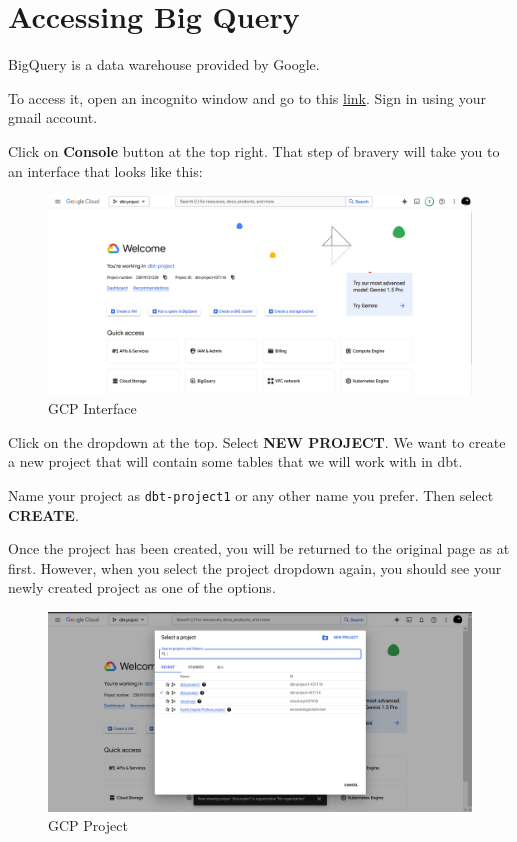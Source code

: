 \documentclass[
]{book}
\begin{document}
\hypertarget{accessing-big-query}{%
\section{Accessing Big Query}\label{accessing-big-query}}

BigQuery is a data warehouse provided by Google.

To access it, open an incognito window and go to this \href{https://cloud.google.com/}{link}. Sign in using your gmail account.

Click on \textbf{Console} button at the top right. That step of bravery will take you to an interface that looks like this:

\begin{figure}
\centering
\includegraphics{./images/gcp_interface.png}
\caption{GCP Interface}
\end{figure}

Click on the dropdown at the top. Select \textbf{NEW PROJECT}. We want to create a new project that will contain some tables that we will work with in dbt.

Name your project as \texttt{dbt-project1} or any other name you prefer. Then select \textbf{CREATE}.

Once the project has been created, you will be returned to the original page as at first. However, when you select the project dropdown again, you should see your newly created project as one of the options.

\begin{figure}
\centering
\includegraphics{./images/gcp_project.png}
\caption{GCP Project}
\end{figure}
\end{document}
